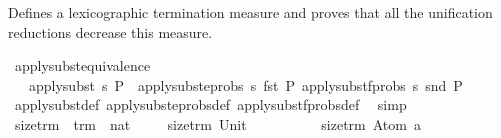 %
\begin{isabellebody}%
%
%
\isadelimtheory
%
\endisadelimtheory
%
\isatagtheory
%
\endisatagtheory
{\isafoldtheory}%
%
\isadelimtheory
%
\endisadelimtheory
%
\isadelimdocument
%
\endisadelimdocument
%
\isatagdocument
%
\isamarkuptrue%
%
\endisatagdocument
{\isafolddocument}%
%
\isadelimdocument
%
\endisadelimdocument
%
\begin{isamarkuptext}%
Defines a lexicographic termination measure and proves that all the unification
  reductions decrease this measure.%
\end{isamarkuptext}\isamarkuptrue%
\isamarkupfalse%
\ apply{\isacharunderscore}{\kern0pt}subst{\isacharunderscore}{\kern0pt}equivalence{\isacharcolon}{\kern0pt}\ \isanewline
\ \ \ {\isachardoublequoteopen}apply{\isacharunderscore}{\kern0pt}subst\ s\ P\ {\isacharequal}{\kern0pt}\ {\isacharparenleft}{\kern0pt}apply{\isacharunderscore}{\kern0pt}subst{\isacharunderscore}{\kern0pt}eprobs\ s\ {\isacharparenleft}{\kern0pt}fst\ P{\isacharparenright}{\kern0pt}{\isacharcomma}{\kern0pt}\ apply{\isacharunderscore}{\kern0pt}subst{\isacharunderscore}{\kern0pt}fprobs\ s\ {\isacharparenleft}{\kern0pt}snd\ P{\isacharparenright}{\kern0pt}{\isacharparenright}{\kern0pt}{\isachardoublequoteclose}\isanewline
%
\isadelimproof
\ \ %
\endisadelimproof
%
\isatagproof
{}\isamarkupfalse%
\ apply{\isacharunderscore}{\kern0pt}subst{\isacharunderscore}{\kern0pt}def\ apply{\isacharunderscore}{\kern0pt}subst{\isacharunderscore}{\kern0pt}eprobs{\isacharunderscore}{\kern0pt}def\ apply{\isacharunderscore}{\kern0pt}subst{\isacharunderscore}{\kern0pt}fprobs{\isacharunderscore}{\kern0pt}def\ \isamarkupfalse%
\ simp%
\endisatagproof
{\isafoldproof}%
%
\isadelimproof
\isanewline
%
\endisadelimproof
\isanewline
\isanewline
{}\isamarkupfalse%
\ size{\isacharunderscore}{\kern0pt}trm\ {\isacharcolon}{\kern0pt}{\isacharcolon}{\kern0pt}\ {\isachardoublequoteopen}trm\ {\isasymRightarrow}\ nat{\isachardoublequoteclose}\isanewline
\ \ \isanewline
\ \ {\isachardoublequoteopen}size{\isacharunderscore}{\kern0pt}trm\ {\isacharparenleft}{\kern0pt}Unit{\isacharparenright}{\kern0pt}\ \ \ \ \ \ {\isacharequal}{\kern0pt}\ {}{\isachardoublequoteclose}\ {\isacharbar}{\kern0pt}\isanewline
\ \ {\isachardoublequoteopen}size{\isacharunderscore}{\kern0pt}trm\ {\isacharparenleft}{\kern0pt}Atom\ a{\isacharparenright}{\kern0pt}\ \ \ \ {\isacharequal}{\kern0pt}\ {}{\isachardoublequoteclose}\ {\isacharbar}{\kern0pt}\isanewline

\end{isabellebody}
